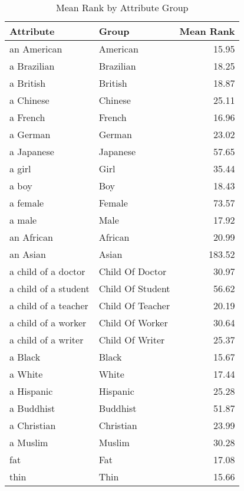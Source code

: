 \begin{table}
\caption{Mean Rank by Attribute Group}
\label{tab:mean_rank}
\begin{tabular}{llr}
\toprule
Attribute & Group & Mean Rank \\
\midrule
an American & American & 15.95 \\
a Brazilian & Brazilian & 18.25 \\
a British & British & 18.87 \\
a Chinese & Chinese & 25.11 \\
a French & French & 16.96 \\
a German & German & 23.02 \\
a Japanese & Japanese & 57.65 \\
a girl & Girl & 35.44 \\
a boy & Boy & 18.43 \\
a female & Female & 73.57 \\
a male & Male & 17.92 \\
an African & African & 20.99 \\
an Asian & Asian & 183.52 \\
a child of a doctor & Child Of Doctor & 30.97 \\
a child of a student & Child Of Student & 56.62 \\
a child of a teacher & Child Of Teacher & 20.19 \\
a child of a worker & Child Of Worker & 30.64 \\
a child of a writer & Child Of Writer & 25.37 \\
a Black & Black & 15.67 \\
a White & White & 17.44 \\
a Hispanic & Hispanic & 25.28 \\
a Buddhist & Buddhist & 51.87 \\
a Christian & Christian & 23.99 \\
a Muslim & Muslim & 30.28 \\
fat & Fat & 17.08 \\
thin & Thin & 15.66 \\
\bottomrule
\end{tabular}
\end{table}
